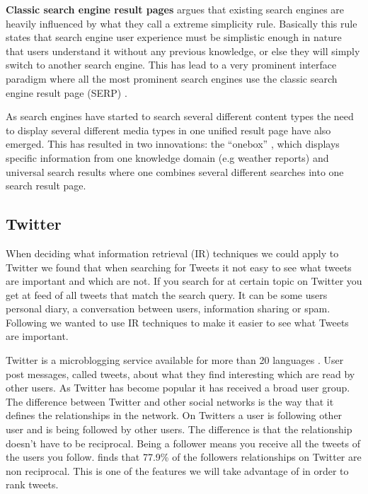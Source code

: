 {\bf \noindent Classic search engine result pages}\newline
\citet[p.480]{Baeza-Yates2011} argues that existing search engines are heavily influenced by what they call a extreme simplicity rule. Basically this rule states that search engine user experience must be simplistic enough in nature that users understand it without any previous knowledge, or else they will simply switch to another search engine. This has lead to a very prominent interface paradigm where all the most prominent search engines use the classic search engine result page (SERP) \citep{Baeza-Yates2011}. 

As search engines have started to search several different content types the need to display several different media types in one unified result page have also emerged. This has resulted in two innovations: the “onebox” \citep{Baeza-Yates2011}, which displays specific information from one knowledge domain (e.g weather reports) and universal search results where one combines several different searches into one search result page.

\subsection{Twitter}
\label{Twitter}
When deciding what information retrieval (IR) techniques we could apply to Twitter we found that when searching for Tweets it not easy to see what tweets are important and which are not. If you search for at certain topic on Twitter you get at feed of all tweets that match the search query. It can be some users personal diary, a conversation between users, information sharing or spam. Following we wanted to use IR techniques to make it easier to see what Tweets are important. 

Twitter is a microblogging service available for more than 20 languages \citep{Twitter2012}. User post messages, called tweets, about what they find interesting which are read by other users. As Twitter has become popular it has received a broad user group. The difference between Twitter and other social networks is the way  that it defines the relationships in the network. On Twitters a user is following other user and is being followed by other users. The difference is that the relationship doesn't have to be reciprocal. Being a follower means you receive all the tweets of the users you follow. \citep{Kwak2010} finds that 77.9\% of the followers relationships on Twitter are non reciprocal. This is one of the features we will take advantage of in order to rank tweets. 

